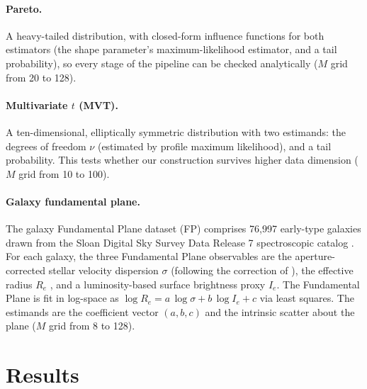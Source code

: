 \documentclass[runningheads]{llncs}
\begin{document}
\paragraph{Pareto.} A heavy-tailed distribution, with closed-form influence functions for both estimators (the shape parameter's maximum-likelihood estimator, and a tail probability), so every stage of the pipeline can be checked analytically ($M$ grid from 20 to 128).

\paragraph{Multivariate $t$ (MVT).} A ten-dimensional, elliptically symmetric distribution with two estimands: the degrees of freedom $\nu$ (estimated by profile maximum likelihood), and a tail probability. This tests whether our  construction survives higher data dimension ($M$ grid from 10 to 100).

\paragraph{Galaxy fundamental plane.} The galaxy Fundamental Plane dataset (FP) comprises 76{,}997 early-type galaxies drawn from the Sloan Digital Sky Survey Data Release 7 spectroscopic catalog \cite{abazajian2009}. 
For each galaxy, the three Fundamental Plane observables are the aperture-corrected stellar velocity dispersion $\sigma$ (following the correction of \cite{jorgensen1995}), the 
effective radius $R_e$ 
, and a luminosity-based surface brightness proxy $I_e$.
The Fundamental Plane is fit in log-space as $\log R_e = a\,\log\sigma + b\,\log I_e + c$ via least squares. The estimands are the coefficient vector $(a,b,c)$ and the intrinsic scatter about the plane ($M$ grid from 8 to 128).


\section{Results}\label{sec:results}
\end{document}
